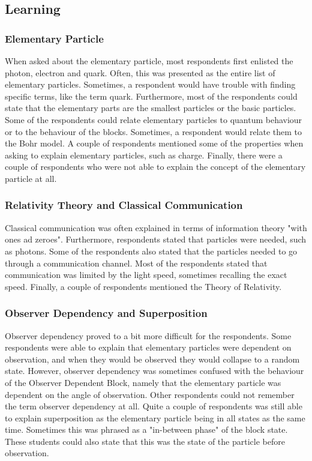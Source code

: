 \documentclass[11pt,twoside]{report} %
\begin{document}
\subsection{Learning}

\subsubsection{Elementary Particle}

When asked about the elementary particle, most respondents first enlisted the photon, electron and quark. Often, this was presented as the entire list of elementary particles. Sometimes, a respondent would have trouble with finding specific terms, like the term quark. Furthermore, most of the respondents could state that the elementary parts are the smallest particles or the basic particles. Some of the respondents could relate elementary particles to quantum behaviour or to the behaviour of the blocks. Sometimes, a respondent would relate them to the Bohr model. A couple of respondents mentioned some of the properties when asking to explain elementary particles, such as charge. Finally, there were a couple of respondents who were not able to explain the concept of the elementary particle at all.

\subsubsection{Relativity Theory and Classical Communication}

Classical communication was often explained in terms of information theory "with ones ad zeroes". Furthermore, respondents stated that particles were needed, such as photons. Some of the respondents also stated that the particles needed to go through a communication channel. Most of the respondents stated that communication was limited by the light speed, sometimes recalling the exact speed. Finally, a couple of respondents mentioned the Theory of Relativity.

\subsubsection{Observer Dependency and Superposition}

Observer dependency proved to a bit more difficult for the respondents. Some respondents were able to explain that elementary particles were dependent on observation, and when they would be observed they would collapse to a random state. However, observer dependency was sometimes confused with the behaviour of the Observer Dependent Block, namely that the elementary particle was dependent on the angle of observation. Other respondents could not remember the term observer dependency at all. Quite a couple of respondents was still able to explain superposition as the elementary particle being in all states as the same time. Sometimes this was phrased as a "in-between phase" of the block state. These students could also state that this was the state of the particle before observation.
\end{document}

